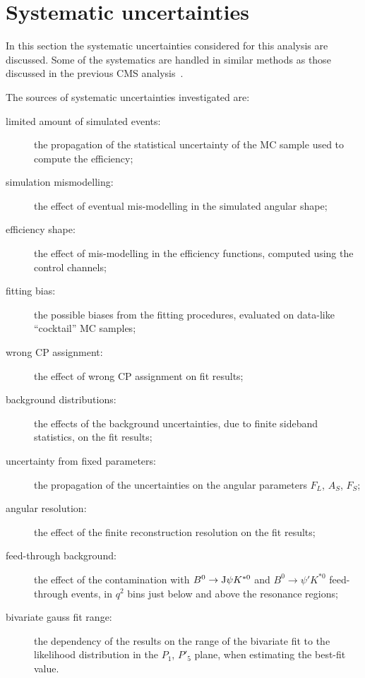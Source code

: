 \chapter{Systematic uncertainties}\label{sec:syst}

In this section the systematic uncertainties considered for this analysis are discussed.
Some of the systematics are handled in similar methods as those discussed in the previous CMS analysis~\cite{Khachatryan:2015isa,AN-14-129}.

The sources of systematic uncertainties investigated are:
\begin{description}
\item[limited amount of simulated events:] the propagation of the statistical uncertainty of the MC sample used to compute the efficiency;

\item[simulation mismodelling:] the effect of eventual mis-modelling in the simulated angular shape;

\item[efficiency shape:] the effect of mis-modelling in the efficiency functions, computed using the control channels;

\item[fitting bias:] the possible biases from the fitting procedures, evaluated on data-like ``cocktail'' MC samples;

\item[wrong CP assignment:] the effect of wrong CP assignment on fit results;

\item[background distributions:] the effects of the background \pdf uncertainties, due to finite sideband statistics, on the fit results;

\item[uncertainty from fixed \pdf parameters:] the propagation of the uncertainties on the angular parameters $F_L$, $A_S$, $F_S$;

\item[angular resolution:] the effect of the finite reconstruction resolution on the fit results;
  
\item[feed-through background:] the effect of the contamination with $B^0 \to {\rm J}\psi K^{*0}$ and $B^0 \to \psi' K^{*0}$ feed-through events, in $q^2$ bins just below and above the resonance regions;

\item[bivariate gauss fit range:] the dependency of the results on the range of the bivariate fit to the likelihood distribution in the $P_1$, $P'_5$ plane, when estimating the best-fit value.

\end{description}

